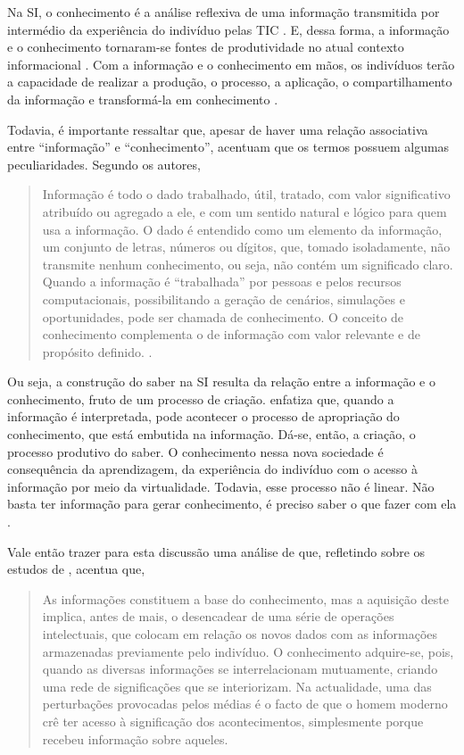 \documentclass[portuguese]{textolivre}
\begin{document}
Na SI, o conhecimento é a análise reflexiva de uma informação
transmitida por intermédio da experiência do indivíduo pelas TIC
\cite{castells2016}. E, dessa forma, a informação e o conhecimento
tornaram-se fontes de produtividade no atual contexto informacional
\cite{levy2011}. Com a informação e o conhecimento em mãos, os
indivíduos terão a capacidade de realizar a produção, o processo, a
aplicação, o compartilhamento da informação e transformá-la em
conhecimento \cite{takahashi2000}.

Todavia, é importante ressaltar que, apesar de haver uma relação
associativa entre ``informação'' e ``conhecimento'', \textcite{rezende2000}
acentuam que os termos possuem algumas peculiaridades. Segundo os
autores,

\begin{quote}
Informação é todo o dado trabalhado, útil, tratado, com valor
significativo atribuído ou agregado a ele, e com um sentido natural e
lógico para quem usa a informação. O dado é entendido como um elemento
da informação, um conjunto de letras, números ou dígitos, que, tomado
isoladamente, não transmite nenhum conhecimento, ou seja, não contém um
significado claro. Quando a informação é ``trabalhada'' por pessoas e
pelos recursos computacionais, possibilitando a geração de cenários,
simulações e oportunidades, pode ser chamada de conhecimento. O conceito
de conhecimento complementa o de informação com valor relevante e de
propósito definido. \cite[p.~60]{abreu2001}.
\end{quote}

Ou seja, a construção do saber na SI resulta da relação entre a
informação e o conhecimento, fruto de um processo de criação. \textcite{levy2011}
enfatiza que, quando a informação é interpretada, pode acontecer
o processo de apropriação do conhecimento, que está embutida na
informação. Dá-se, então, a criação, o processo produtivo do saber. O
conhecimento nessa nova sociedade é consequência da aprendizagem, da
experiência do indivíduo com o acesso à informação por meio da
virtualidade. Todavia, esse processo não é linear. Não basta ter
informação para gerar conhecimento, é preciso saber o que fazer com ela
\cite{assmann1999, junqueiro2009, castells2016}.

Vale então trazer para esta discussão uma análise de \textcite[p.~88]{pellicer1997}
que, refletindo sobre os estudos de \textcite[p.~11]{ausubel1982},%
acentua que,

\begin{quote}
As informações constituem a base do conhecimento, mas a aquisição deste
implica, antes de mais, o desencadear de uma série de operações
intelectuais, que colocam em relação os novos dados com as informações
armazenadas previamente pelo indivíduo. O conhecimento adquire-se, pois,
quando as diversas informações se interrelacionam mutuamente, criando
uma rede de significações que se interiorizam. Na actualidade, uma das
perturbações provocadas pelos médias é o facto de que o homem moderno
crê ter acesso à significação dos acontecimentos, simplesmente porque
recebeu informação sobre aqueles.
\end{quote}
\end{document}
